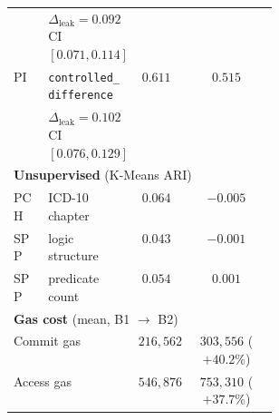 \begin{table}[t]
\begin{tabular}{lp{0.34\linewidth}cc}
          & \quad $\Delta_{\text{leak}}=0.092$ CI$[0.071,0.114]$ & & \\
    PI    & \texttt{controlled\_difference}  & $0.611$ & $0.515$ \\
          & \quad $\Delta_{\text{leak}}=0.102$ CI$[0.076,0.129]$ & & \\
    \midrule
    \multicolumn{4}{l}{\textbf{Unsupervised} (K-Means ARI)} \\
    PCH   & ICD-10 chapter                   & $0.064$ & $-0.005$ \\
    SPP   & logic structure                  & $0.043$ & $-0.001$ \\
    SPP   & predicate count                  & $0.054$ & $0.001$  \\
    \midrule
    \multicolumn{4}{l}{\textbf{Gas cost} (mean, B1 $\to$ B2)} \\
    \multicolumn{2}{l}{Commit gas} & $216{,}562$ & $303{,}556$ ($+40.2\%$) \\
    \multicolumn{2}{l}{Access gas} & $546{,}876$ & $753{,}310$ ($+37.7\%$) \\
    \bottomrule
  \end{tabular}
\end{table}
